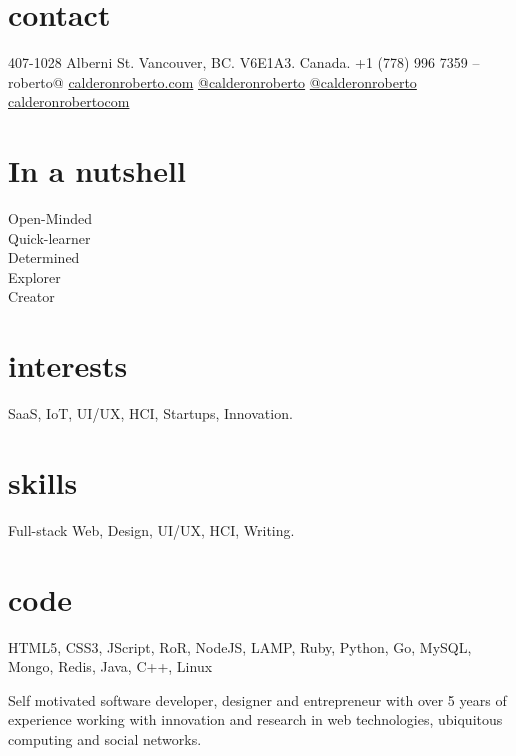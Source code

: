 \documentclass[full]{rvca}
\begin{document}


\begin{aside} %
\section{contact}
407-1028 Alberni St.
Vancouver, BC.
V6E1A3. Canada.
+1 (778) 996 7359
--
roberto@
\href{http://calderonroberto.com}{calderonroberto.com}
\emph{ } %
\TwitterIcon  \href{http://twitter.com/calderonroberto}{@calderonroberto} 
\GithubIcon \href{https://github.com/calderonroberto}{@calderonroberto} 
\LinkedinIcon \href{https://ca.linkedin.com/in/calderonrobertocom}{calderonrobertocom} 
%
\QrCode
%
\section{In a nutshell}
Open-Minded\\Quick-learner\\Determined\\Explorer\\Creator 
% 
\section{interests}
SaaS, IoT, UI/UX, HCI, Startups, Innovation.
%
\section{skills}
Full-stack Web, Design,
UI/UX, HCI, Writing.
% 
\section{code}
HTML5, CSS3, \HeartIcon JScript, 
\HeartIcon RoR, \HeartIcon NodeJS, LAMP,
\HeartIcon Ruby, Python, \HeartIcon Go,
MySQL, Mongo, Redis,
Java, C++, \HeartIcon Linux
\end{aside}


\begin{statement}
Self motivated software developer, designer and entrepreneur with over 5 years of experience working with innovation and research in web technologies, ubiquitous computing and social networks.
\end{statement}
\end{document}
